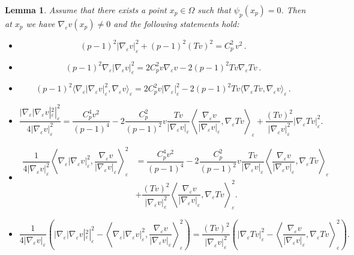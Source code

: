 \documentclass[10pt]{amsart}
\numberwithin{equation}{section}
\newtheorem{lemma}[theorem]{Lemma}
\theoremstyle{definition}
\newcommand{\eps}{\varepsilon}
\newcommand{\egrad}{\nabla_{\eps}}
\begin{document}
\begin{lemma}
	Assume that there exists a point $x_p \in \Omega$ such that $\psi_{p}(x_p)=0$.  Then  at $x_p$ we have $\egrad v (x_p) \neq 0$ and the following statements hold:
	\begin{itemize}
		\item[i)]  \[(p-1)^2 |\nabla_{\varepsilon}v|_{\varepsilon}^{2} + (p-1)^2(Tv)^2 = C_p^2 \, v^2 \, . \]
		\item[ii)] \[ (p-1)^2 \nabla_{\varepsilon}|\nabla_{\varepsilon}v|_{\varepsilon}^2 = 2 C_p^2 v \nabla_{\varepsilon}v - 2(p-1)^2 Tv \nabla_{\varepsilon}Tv \, . \]
		\item[iii)] \[ (p-1)^2 \langle \nabla_{\varepsilon}|\nabla_{\varepsilon}v|_{\varepsilon}^{2}, \nabla_{\varepsilon}v \rangle_{\varepsilon} = 2C_{p}^2v |\nabla_{\varepsilon}|_{\varepsilon}^{2} - 2 (p-1)^{2}Tv \langle \nabla_{\varepsilon}Tv, \nabla_{\varepsilon}v\rangle_{\varepsilon} \, . \]
		\item[iv)] \[ \dfrac{|\nabla_{\varepsilon}|\nabla_{\varepsilon}v|_{\varepsilon}^{2}|_{\varepsilon}^{2}}{4|\nabla_{\varepsilon}v|_{\varepsilon}^2} = \dfrac{C_p^4 v^2}{(p-1)^4} - 2\dfrac{C_p^2}{(p-1)^2} v \dfrac{Tv}{|\nabla_{\varepsilon}v|_{\varepsilon}}\left\langle \dfrac{\nabla_{\varepsilon}v}{|\nabla_{\varepsilon}v|_{\varepsilon}}, \nabla_{\varepsilon}Tv \right\rangle_{\varepsilon} + \dfrac{(Tv)^2}{|\nabla_{\varepsilon}v|_{\varepsilon}^2} |\nabla_{\varepsilon}Tv|_{\varepsilon}^2. \]
		\item[v)] 
		\begin{equation*}
		\begin{aligned} \dfrac{1}{4|\nabla_{\varepsilon}v|_{\varepsilon}^2} \left\langle \nabla_{\varepsilon}|\nabla_{\varepsilon}v|_{\varepsilon}^2, \dfrac{\nabla_{\varepsilon}v}{|\nabla_{\varepsilon}v|_{\varepsilon}}\right\rangle_{\varepsilon}^2 
		& = \dfrac{C_p^4 v^2}{(p-1)^4} - 2\dfrac{C_p^2}{(p-1)^2} v \dfrac{Tv}{|\nabla_{\varepsilon}v|_{\varepsilon}}\left\langle \dfrac{\nabla_{\varepsilon}v}{|\nabla_{\varepsilon}v|_{\varepsilon}}, \nabla_{\varepsilon}Tv \right\rangle_{\varepsilon} \\& + \dfrac{(Tv)^2}{|\nabla_{\varepsilon}v|_{\varepsilon}^2} \left\langle \dfrac{\nabla_{\varepsilon}v}{|\nabla_{\varepsilon}v|_{\varepsilon}},\nabla_{\varepsilon}Tv \right\rangle_{\varepsilon}^2. 
		\end{aligned}
		\end{equation*}
		\item[vi)]
		\[ \dfrac{1}{4|\nabla_{\varepsilon}v|_{\varepsilon}}\left(|\nabla_{\varepsilon}|\nabla_{\varepsilon}v|_{\varepsilon}^{2}|_{\varepsilon}^{2} - \left\langle \nabla_{\varepsilon}|\nabla_{\varepsilon}v|_{\varepsilon}^2, \dfrac{\nabla_{\varepsilon}v}{|\nabla_{\varepsilon}v|_{\varepsilon}}\right\rangle_{\varepsilon}^2 \right) =  \dfrac{(Tv)^2}{|\nabla_{\varepsilon}v|_{\varepsilon}^2} \left( |\nabla_{\varepsilon}Tv|_{\varepsilon}^2 -  \left\langle \dfrac{\nabla_{\varepsilon}v}{|\nabla_{\varepsilon}v|_{\varepsilon}},\nabla_{\varepsilon}Tv \right\rangle_{\varepsilon}^2 \right). \]

\end{itemize}
\end{lemma}
\end{document}
